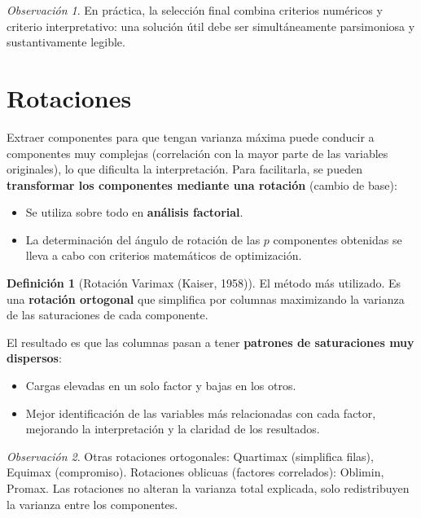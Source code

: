 \documentclass[12pt, a4paper]{article}
\theoremstyle{plain}
\theoremstyle{definition}
\newtheorem{definicion}[teorema]{Definición}
\theoremstyle{remark}
\newtheorem*{observacion}{Observación}
\begin{document}
\begin{observacion}
En práctica, la selección final combina criterios numéricos y criterio
interpretativo: una solución útil debe ser simultáneamente parsimoniosa y
sustantivamente legible.
\end{observacion}

\section{Rotaciones}

Extraer componentes para que tengan varianza máxima puede conducir a
componentes muy complejas (correlación con la mayor parte de las variables
originales), lo que dificulta la interpretación. Para facilitarla, se pueden
\textbf{transformar los componentes mediante una rotación} (cambio de base):
\begin{itemize}
  \item Se utiliza sobre todo en \textbf{análisis factorial}.
  \item La determinación del ángulo de rotación de las $p$ componentes
        obtenidas se lleva a cabo con criterios matemáticos de optimización.
\end{itemize}

\begin{definicion}[Rotación Varimax (Kaiser, 1958)]
El método más utilizado. Es una \textbf{rotación ortogonal} que simplifica
por columnas maximizando la varianza de las saturaciones de cada componente.
\end{definicion}

El resultado es que las columnas pasan a tener \textbf{patrones de
saturaciones muy dispersos}:
\begin{itemize}
  \item Cargas elevadas en un solo factor y bajas en los otros.
  \item Mejor identificación de las variables más relacionadas con cada
        factor, mejorando la interpretación y la claridad de los resultados.
\end{itemize}

\begin{observacion}
Otras rotaciones ortogonales: Quartimax (simplifica filas), Equimax
(compromiso). Rotaciones oblicuas (factores correlados): Oblimin, Promax.
Las rotaciones no alteran la varianza total explicada, solo redistribuyen
la varianza entre los componentes.
\end{observacion}
\end{document}
